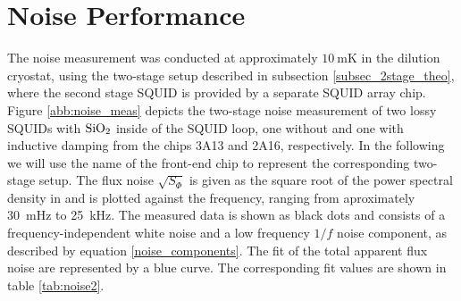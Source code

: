  




\section{Noise Performance} \label{sec_noise_results}


The noise measurement was conducted at approximately $\qty{10}{\milli\kelvin}$ in the dilution cryostat, using the two-stage setup described in subsection \ref{subsec_2stage_theo}, where the second stage SQUID is provided by a separate SQUID array chip. Figure \ref{abb:noise_meas} depicts the two-stage noise measurement of two lossy SQUIDs with ${\rm SiO_2}$ inside of the SQUID loop, one without and one with inductive damping from the chips 3A13 and 2A16, respectively. In the following we will use the name of the front-end chip to represent the corresponding two-stage setup. The flux noise $\sqrt{S_\Phi}$ is given as the square root of the power spectral density in and is plotted against the frequency, ranging from aproximately \qty{30}{\milli\hertz} to \qty{25}{\kHz}. The measured data is shown as black dots and consists of a frequency-independent white noise and a low frequency $1/f$ noise component, as described by equation \ref{noise_components}. The fit of the total apparent flux noise are represented by a blue curve. The corresponding fit values are shown in table \ref{tab:noise2}.

